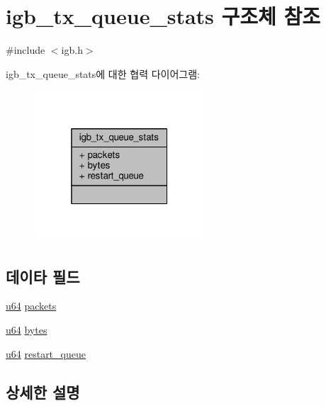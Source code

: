 \hypertarget{structigb__tx__queue__stats}{}\section{igb\+\_\+tx\+\_\+queue\+\_\+stats 구조체 참조}
\label{structigb__tx__queue__stats}


{\ttfamily \#include $<$igb.\+h$>$}



igb\+\_\+tx\+\_\+queue\+\_\+stats에 대한 협력 다이어그램\+:
\nopagebreak
\begin{figure}[H]
\begin{center}
\leavevmode
\includegraphics[width=181pt]{structigb__tx__queue__stats__coll__graph}
\end{center}
\end{figure}
\subsection*{데이타 필드}
\begin{DoxyCompactItemize}
\item 
\hyperlink{lib_2igb_2e1000__osdep_8h_a1d8f78f95a414480659f3182e6067b80}{u64} \hyperlink{structigb__tx__queue__stats_ae5fef1d76642baa9a22fafc8c04907c5}{packets}
\item 
\hyperlink{lib_2igb_2e1000__osdep_8h_a1d8f78f95a414480659f3182e6067b80}{u64} \hyperlink{structigb__tx__queue__stats_a1b0587fe9418ec065eee9e7593528b12}{bytes}
\item 
\hyperlink{lib_2igb_2e1000__osdep_8h_a1d8f78f95a414480659f3182e6067b80}{u64} \hyperlink{structigb__tx__queue__stats_af4a2d173ec4fcd7b2bf5a7b8e51e2fcd}{restart\+\_\+queue}
\end{DoxyCompactItemize}


\subsection{상세한 설명}


